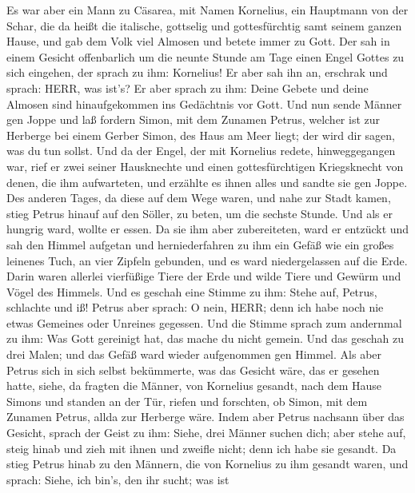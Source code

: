  Es war aber ein Mann zu Cäsarea, mit Namen Kornelius, ein
Hauptmann von der Schar, die da heißt die italische, 
gottselig und gottesfürchtig samt seinem ganzen Hause, und gab dem Volk
viel Almosen und betete immer zu Gott.  Der sah in einem
Gesicht offenbarlich um die neunte Stunde am Tage einen Engel Gottes zu
sich eingehen, der sprach zu ihm: Kornelius!  Er aber sah
ihn an, erschrak und sprach: HERR, was ist's? Er aber sprach zu ihm:
Deine Gebete und deine Almosen sind hinaufgekommen ins Gedächtnis vor
Gott.  Und nun sende Männer gen Joppe und laß fordern Simon,
mit dem Zunamen Petrus,  welcher ist zur Herberge bei einem
Gerber Simon, des Haus am Meer liegt; der wird dir sagen, was du tun
sollst.  Und da der Engel, der mit Kornelius redete,
hinweggegangen war, rief er zwei seiner Hausknechte und einen
gottesfürchtigen Kriegsknecht von denen, die ihm aufwarteten,
 und erzählte es ihnen alles und sandte sie gen Joppe.
 Des anderen Tages, da diese auf dem Wege waren, und nahe
zur Stadt kamen, stieg Petrus hinauf auf den Söller, zu beten, um die
sechste Stunde.  Und als er hungrig ward, wollte er essen.
Da sie ihm aber zubereiteten, ward er entzückt  und sah den
Himmel aufgetan und herniederfahren zu ihm ein Gefäß wie ein großes
leinenes Tuch, an vier Zipfeln gebunden, und es ward niedergelassen auf
die Erde.  Darin waren allerlei vierfüßige Tiere der Erde
und wilde Tiere und Gewürm und Vögel des Himmels.  Und es
geschah eine Stimme zu ihm: Stehe auf, Petrus, schlachte und iß!
 Petrus aber sprach: O nein, HERR; denn ich habe noch nie
etwas Gemeines oder Unreines gegessen.  Und die Stimme
sprach zum andernmal zu ihm: Was Gott gereinigt hat, das mache du nicht
gemein.  Und das geschah zu drei Malen; und das Gefäß ward
wieder aufgenommen gen Himmel.  Als aber Petrus sich in
sich selbst bekümmerte, was das Gesicht wäre, das er gesehen hatte,
siehe, da fragten die Männer, von Kornelius gesandt, nach dem Hause
Simons und standen an der Tür,  riefen und forschten, ob
Simon, mit dem Zunamen Petrus, allda zur Herberge wäre. 
Indem aber Petrus nachsann über das Gesicht, sprach der Geist zu ihm:
Siehe, drei Männer suchen dich;  aber stehe auf, steig
hinab und zieh mit ihnen und zweifle nicht; denn ich habe sie gesandt.
 Da stieg Petrus hinab zu den Männern, die von Kornelius zu
ihm gesandt waren, und sprach: Siehe, ich bin's, den ihr sucht; was ist
